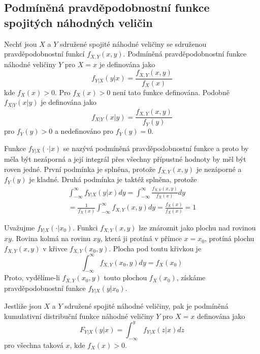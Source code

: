 \subsection{Podmíněná pravděpodobnostní funkce spojitých náhodných veličin}

\begin{definition}
Nechť jsou $X$ a $Y$ sdružené spojité náhodné veličiny se sdruženou pravděpodobnostní funkcí $f_{X,Y}(x,y)$. Podmíněná pravděpodobnostní funkce náhodné veličiny $Y$ pro $X = x$ je definována jako
\begin{equation*}
f_{Y|X}(y|x) = \frac{f_{X,Y}(x,y)}{f_X(x)}
\end{equation*}
kde $f_X(x) > 0$. Pro $f_X(x) > 0$ není tato funkce definována. Podobně $f_{X|Y}(x|y)$ je definována jako
\begin{equation*}
f_{X|Y}(x|y) = \frac{f_{X,Y}(x,y)}{f_Y(y)}
\end{equation*}
pro $f_Y(y) > 0$ a nedefinováno pro $f_Y(y) = 0$.
\end{definition}

Funkce $f_{Y|X}(\cdot | x)$ se nazývá podmíněná pravděpodobnostní funkce a proto by měla být nezáporná a její integrál přes všechny přípustné hodnoty by měl být roven jedné. První podmínka je splněna, protože $f_{X,Y}(x,y)$ je nezáporné a $f_Y(y)$ je kladné. Druhá podmínka je taktéž splněna, protože
\begin{gather*}
\int_{-\infty}^{\infty} f_{Y|X}(y|x)dy = \int_{-\infty}^{\infty} \frac{f_{X,Y}(x,y)}{f_X(x)}dy\\
= \frac{1}{f_X(x)} \int_{-\infty}^{\infty} f_{X,Y}(x,y)dy = \frac{f_X(x)}{f_X(x)} = 1
\end{gather*}

Uvažujme $f_{Y|X}(\cdot | x_0)$. Funkci $f_{X,Y}(x,y)$ lze znároznit jako plochu nad rovinou $xy$. Rovina kolmá na rovinu $xy$, která ji protíná v přímce $x = x_0$, protíná plochu $f_{X,Y}(x,y)$ v křivce $f_{X,Y}(x_0,y)$. Plocha pod toutu křivkou je
\begin{equation*}
\int_{-\infty}^{\infty}f_{X,Y}(x_0, y)dy = f_X(x_0)
\end{equation*}
Proto, vydělíme-li $f_{X,Y}(x_0,y)$ touto plochou $f_X(x_0)$, získáme pravděpodobnostní funkce $f_{Y|X}(y|x_0)$.

\begin{definition}
Jestliže jsou $X$ a $Y$ sdružené spojité náhodné veličiny, pak je podmíněná kumulativní distribuční funkce náhodné veličiny $Y$ pro $X = x$ definována jako
\begin{equation*}
F_{Y|X}(y|x) = \int_{-\infty}^y f_{Y|X}(z|x)dz
\end{equation*}
pro všechna taková $x$, kde $f_X(x) > 0$.
\end{definition}

